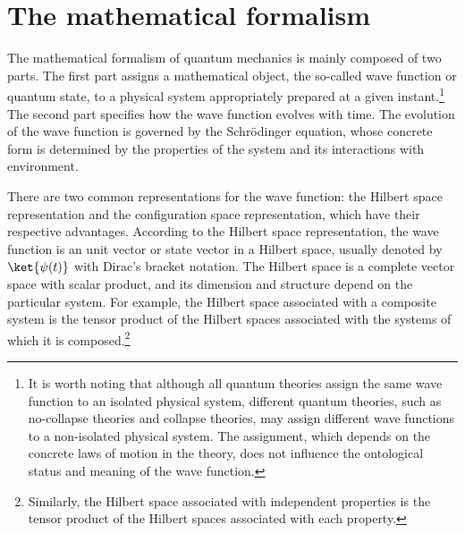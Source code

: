 \section{The mathematical formalism}

The mathematical formalism of quantum mechanics is mainly composed of two parts. The first part assigns a mathematical object, the so-called wave function or quantum state, to a physical system appropriately prepared at a given instant.\footnote{It is worth noting that although all quantum theories assign the same wave function to an isolated physical system, different quantum theories, such as no-collapse theories and collapse theories, may assign different wave functions to a non-isolated physical system. The assignment, which depends on the concrete laws of motion in the theory, does not influence the ontological status and meaning of the wave function.}
The second part specifies how the wave function evolves with time. The evolution of the wave function is governed by the Schr\"{o}dinger equation, whose concrete form is determined by the properties of the system and its interactions with environment.

There are two common representations for the wave function: the Hilbert space representation and the configuration space representation, which have their respective advantages. According to the Hilbert space representation, the wave function is an unit vector or state vector in a Hilbert space, usually denoted by $\ket{\psi(t)}$ with Dirac's bracket notation. The Hilbert space is a complete vector space with scalar product, and its dimension and structure depend on the particular system. For example, the Hilbert space associated with a composite system is the tensor product of the Hilbert spaces associated with the systems of which it is composed.\footnote{Similarly, the Hilbert space associated with independent properties is the tensor product of the Hilbert spaces associated with each property.}


